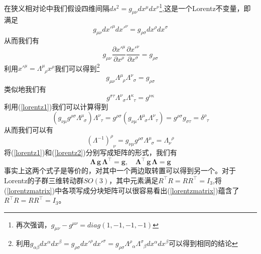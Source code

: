 在狭义相对论中我们假设四维间隔$ds^{2}=g_{\mu\nu}dx^{\mu}dx^{\nu}$\footnote{再次强调，$g_{\mu\nu}-g^{\mu\nu}=diag(1,-1,-1,-1)$},这是一个Lorentz不变量，即满足
\begin{equation}
    g_{\mu\nu}dx'^{\mu}dx'^{\nu}=g_{\rho\sigma}dx^{\rho}dx^{\sigma}
\end{equation}
从而我们有
\begin{equation}
    g_{\mu\nu}\frac{\partial x'^{\mu}}{\partial x^{\rho}}\frac{\partial x'^{\nu}}{\partial x^{\sigma}}=g_{\rho\sigma}
\end{equation}
利用$x'^{\mu}=\Lambda^{\mu}_{\;\;\rho}x^{\rho}$我们可以得到\footnote{利用$g_{\alpha\beta}dx^{\alpha}dx^{\beta}=g_{\rho\sigma}dx'^{\rho}dx'^{\sigma}=g_{\rho\sigma}\Lambda^{\rho}_{\;\;\alpha}\Lambda^{\sigma}_{\;\;\beta}dx^{\alpha}dx^{\beta}$可以得到相同的结论}
\begin{equation}
\label{lorentz1}
    g_{\mu\nu}\Lambda^{\mu}_{\;\;\rho}\Lambda^{\nu}_{\;\;\sigma}=g_{\rho\sigma}
\end{equation}
类似地我们有
\begin{equation}
\label{lorentz2}
    g^{\sigma\tau}\Lambda^{\nu}_{\;\;\sigma}\Lambda^{\kappa}_{\;\;\tau}=g^{\nu\kappa}
\end{equation}
利用(\ref{lorentz1})我们可以计算得到
\begin{equation}
    \left(g_{\nu\mu}g^{\rho\sigma}\Lambda^{\mu}_{\;\;\sigma}\right)\Lambda^{\nu}_{\;\;\tau}=g^{\rho\sigma}\left(g_{\nu\mu}\Lambda^{\mu}_{\;\;\sigma}\Lambda^{\nu}_{\;\;\tau}\right)=g^{\rho\sigma}g_{\sigma\tau}=\delta^{\rho}_{\;\;\tau}
\end{equation}
从而我们可以有
\begin{equation}
    \left(\Lambda^{-1}\right)^{\rho}_{\;\;\nu}=g_{\nu\mu}g^{\rho\sigma}\Lambda^{\mu}_{\;\;\sigma}=\Lambda_{\nu}^{\;\;\rho}
\end{equation}
将(\ref{lorentz1})和(\ref{lorentz2})分别写成矩阵的形式，我们有
\begin{equation}
\label{lorentzmatrix}
    \pmb{\Lambda \,g\,\Lambda}^{\top}=\pmb{g},\quad \pmb{\Lambda}^{\top} \pmb{\,g\,\Lambda}=\pmb{g}
\end{equation}
事实上这两个式子是等价的，对其中一个两边取转置可以得到另一个。对于Lorentz的子群三维转动群$SO(3)$，其中元素满足$R^{\top}R=RR^{\top}=I_{3}$,将(\ref{lorentzmatrix})中各项写成分块矩阵可以很容易看出(\ref{lorentzmatrix})蕴含了$R^{\top}R=RR^{\top}=I_{3}$。

